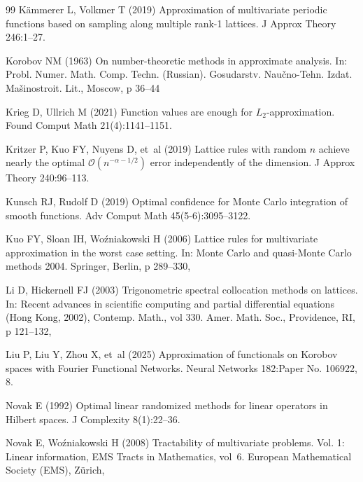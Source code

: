\documentclass[pdflatex,sn-basic,Numbered]{sn-jnl}%
\theoremstyle{thmstyleone}%
\theoremstyle{thmstyletwo}%
\begin{document}
\begin{thebibliography}{99}
K\"ammerer L, Volkmer T (2019) Approximation of multivariate periodic functions
  based on sampling along multiple rank-1 lattices. J Approx Theory 246:1--27.

Korobov NM (1963) On number-theoretic methods in approximate analysis. In:
  Probl. {N}umer. {M}ath. {C}omp. {T}echn. ({R}ussian). Gosudarstv. Nau\v
  cno-Tehn. Izdat. Ma\v sinostroit. Lit., Moscow, p 36--44

Krieg D, Ullrich M (2021) Function values are enough for {$L_2$}-approximation.
  Found Comput Math 21(4):1141--1151. 

Kritzer P, Kuo FY, Nuyens D, et~al (2019) Lattice rules with random {$n$}
  achieve nearly the optimal {$\mathcal{O}(n^{-\alpha-1/2})$} error
  independently of the dimension. J Approx Theory 240:96--113.

Kunsch RJ, Rudolf D (2019) Optimal confidence for {M}onte {C}arlo integration
  of smooth functions. Adv Comput Math 45(5-6):3095--3122.

Kuo FY, Sloan IH, Wo\'zniakowski H (2006) Lattice rules for multivariate
  approximation in the worst case setting. In: Monte {C}arlo and quasi-{M}onte
  {C}arlo methods 2004. Springer, Berlin, p 289--330,

Li D, Hickernell FJ (2003) Trigonometric spectral collocation methods on
  lattices. In: Recent advances in scientific computing and partial
  differential equations ({H}ong {K}ong, 2002), Contemp. Math., vol 330. Amer.
  Math. Soc., Providence, RI, p 121--132, 

Liu P, Liu Y, Zhou X, et~al (2025) {Approximation of functionals on Korobov
  spaces with Fourier Functional Networks}. Neural Networks 182:Paper No.
  106922, 8. 

Novak E (1992) Optimal linear randomized methods for linear operators in
  {H}ilbert spaces. J Complexity 8(1):22--36.

Novak E, Wo\'zniakowski H (2008) Tractability of multivariate problems. {V}ol.
  1: {L}inear information, EMS Tracts in Mathematics, vol~6. European
  Mathematical Society (EMS), Z\"urich, 


\end{thebibliography}
\end{document}
